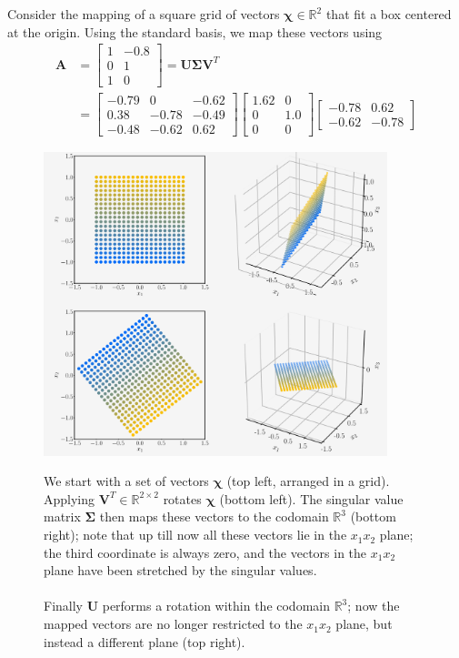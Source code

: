 \documentclass{report}
\begin{document}
Consider the mapping of a square grid of vectors $\bm{\chi}\in\mathbb{R}^2$ that fit a box centered at the origin.
Using the standard basis, we map these vectors using
\begin{align*}
\bm{A}&=\begin{bmatrix}1&-0.8\\0&1\\1&0\end{bmatrix}
=\bm{U\Sigma V}^T\\
&=\begin{bmatrix}-0.79&0&-0.62\\0.38&-0.78&-0.49\\
-0.48&-0.62&0.62\end{bmatrix}\begin{bmatrix}
1.62&0\\0&1.0\\0&0\end{bmatrix}\begin{bmatrix}
-0.78&0.62\\-0.62&-0.78\end{bmatrix}
\end{align*}
\begin{figure}[h]
\begin{center}
\includegraphics[width=10cm]{23}\\
\end{center}
We start with a set of vectors $\bm{\chi}$ (top left, arranged in a grid). Applying 
$\bm{V}^T\in\mathbb{R}^{2\times2}$ rotates $\bm{\chi}$
(bottom left). The singular value matrix $\bm{\Sigma}$
then
maps these vectors to the codomain $\mathbb{R}^3$ (bottom right); note that up till now all these vectors lie in the
$x_1x_2$ plane; the third coordinate is always zero, and the vectors in the $x_1x_2$ plane have been stretched by
the singular values.\\
\vspace{1mm}\\
Finally $\bm{U}$ performs a rotation within the codomain $\mathbb{R}^3$; now the mapped vectors are no longer
restricted to the $x_1x_2$ plane, but instead a different plane (top right).
\end{figure}
\newpage
\end{document}
